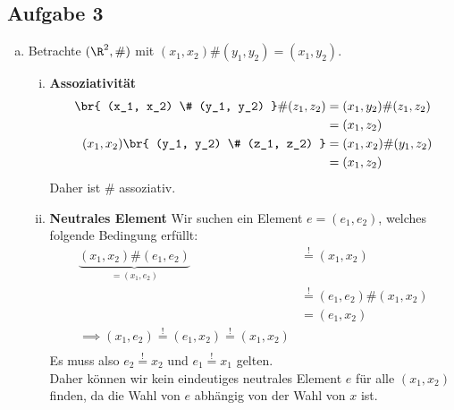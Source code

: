 \subsection*{Aufgabe 3} %
\label{sub:aufgabe_3}
\begin{enumerate}[a)]
  \item Betrachte $ (\R^2, \#) $ mit $ (x_1, x_2)\# (y_1, y_2) = (x_1, y_2) $.
  \begin{enumerate}[i)]
    \item \textbf{Assoziativität}
      \begin{align*}
        \br{ (x_1, x_2) \# (y_1, y_2) } \# (z_1, z_2) &= (x_1, y_2) \# (z_1, z_2) \\
                                                      &= (x_1, z_2) \\
        (x_1, x_2) \br{ (y_1, y_2) \# (z_1, z_2) } &= (x_1, x_2) \# (y_1, z_2) \\
                                                   &= (x_1, z_2) \\
      \end{align*}
      Daher ist $\#$ assoziativ.
    \item \textbf{Neutrales Element}
      Wir suchen ein Element $e = (e_1, e_2)$, welches folgende Bedingung erfüllt:
      \begin{align*}
        \underbrace{(x_1,x_2)\#(e_1, e_2)}_{=(x_1, e_2)} &\overset{!}{=} (x_1, x_2) \\
                              &\overset{!}{=} (e_1, e_2) \# (x_1, x_2) \\
                              &= (e_1, x_2) \\
                \implies (x_1, e_2) \overset{!}{=} (e_1, x_2) \overset{!}{=} (x_1, x_2) \\
      \end{align*}
      Es muss also $e_2 \overset{!}{=} x_2$ und $e_1 \overset{!}{=} x_1$ gelten. \\
      Daher können wir kein eindeutiges neutrales Element $e$ für alle $(x_1, x_2)$ finden, da die Wahl von $e$ abhängig von der Wahl von $x$ ist.


\end{enumerate}
\end{enumerate}
